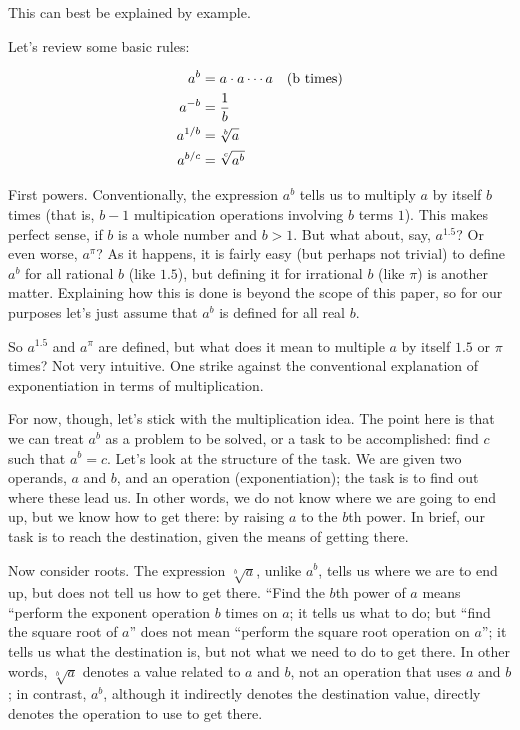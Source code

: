 This can best be explained by example.

Let's review some basic rules:

{
  \begin{alignat}{2}
    a^{b} &= a\cdot a\cdots a \quad \textnormal{(b times)} \\
    a^{-b} &= \frac{1}{b} \\
    a^{1/b} &= \sqrt[b]{a} \\
    a^{b/c} &= \sqrt[c]{a^b}
  \end{alignat}
}

First powers.  Conventionally, the expression $a^b$ tells us to
multiply $a$ by itself $b$ times (that is, $b-1$ multipication
operations involving $b$ terms $1$).  This makes perfect sense, if $b$
is a whole number and $b>1$.  But what about, say, $a^{1.5}$?  Or even
worse, $a^\pi$?  As it happens, it is fairly easy (but perhaps not
trivial) to define $a^b$ for all rational $b$ (like $1.5$), but
defining it for irrational $b$ (like $\pi$) is another matter.
Explaining how this is done is beyond the scope of this paper, so for
our purposes let's just assume that $a^b$ is defined for all real $b$.

So $a^{1.5}$ and $a^\pi$ are defined, but what does it mean to
multiple $a$ by itself $1.5$ or $\pi$ times?  Not very intuitive.  One
strike against the conventional explanation of exponentiation in terms
of multiplication.

For now, though, let's stick with the multiplication idea. The point
here is that we can treat $a^b$ as a problem to be solved, or a task
to be accomplished: find $c$ such that $a^b = c$.  Let's look at the
structure of the task.  We are given two operands, $a$ and $b$, and an
operation (exponentiation); the task is to find out where these lead
us.  In other words, we do not know where we are going to end up, but
we know how to get there: by raising $a$ to the $b$th power.  In
brief, our task is to reach the destination, given the means of
getting there.

Now consider roots.  The expression $\sqrt[b]{a}$, unlike $a^b$, tells
us where we are to end up, but does not tell us how to get there.
``Find the $b$th power of $a$ means ``perform the exponent operation
$b$ times on $a$; it tells us what to do; but ``find the square root
of $a$'' does not mean ``perform the square root operation on $a$'';
it tells us what the destination is, but not what we need to do to get
there.  In other words, $\sqrt[b]{a}$ denotes a value related to $a$
and $b$, not an operation that uses $a$ and $b$; in contrast, $a^b$,
although it indirectly denotes the destination value, directly denotes
the operation to use to get there.

